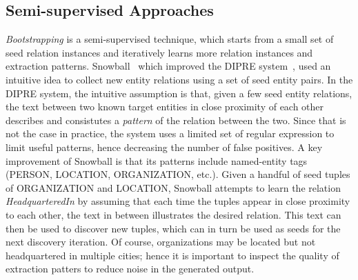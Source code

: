 \subsection{Semi-supervised Approaches}
\textit{Bootstrapping} is a semi-supervised technique, which starts from a small set of seed relation instances and iteratively learns more relation instances and extraction patterns.
Snowball~\cite{agichtein2000snowball} which improved the DIPRE system~\cite{brin1998extracting}, used an intuitive idea to collect new entity relations using a set of seed entity pairs.
In the DIPRE system, the intuitive assumption is that, given a few seed entity relations, the text between two known target entities in close proximity of each other describes and consistutes a \textit{pattern} of the relation between the two. 
Since that is not the case in practice, the system uses a limited set of regular expression to limit useful patterns, hence decreasing the number of false positives.
A key improvement of Snowball
is that its patterns include named-entity tags (PERSON, LOCATION, ORGANIZATION, etc.).
Given a handful of seed tuples of ORGANIZATION and LOCATION, Snowball attempts to learn the relation \textit{HeadquarteredIn} by assuming that each time the tuples appear in close proximity to each other, 
the text in between illustrates the desired relation.
This text can then be used to discover new tuples, which can in turn be used as seeds for the next discovery iteration.
Of course, organizations may be located but not headquartered in multiple cities;
hence it is important to inspect the quality of extraction patters to reduce noise in the generated output.

